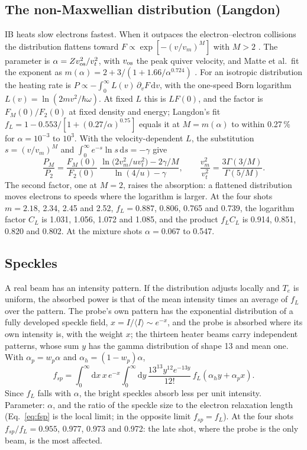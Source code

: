 \documentclass[11pt]{article}
\numberwithin{equation}{section}
\newcommand{\dd}{\mathrm d}
\newcommand{\vos}{v_{\rm os}}
\begin{document}
\subsection{The non-Maxwellian distribution (Langdon)}
\label{sec:langdon}
IB heats slow electrons fastest. When it outpaces the electron--electron collisions the
distribution flattens toward $F\propto\exp[-(v/v_m)^M]$ with $M>2$ \cite{Langdon1980}.
The parameter is $\alpha=Z\vos^2/v_t^2$, with $\vos$ the peak quiver velocity, and Matte et
al.\ fit the exponent as $m(\alpha)=2+3/(1+1.66/\alpha^{0.724})$ \cite{Matte1988}. For an
isotropic distribution the heating rate is $P\propto-\int_0^\infty L(v)\,\partial_vF\,\dd v$,
with the one-speed Born logarithm $L(v)=\ln(2mv^2/\hbar\omega)$. At fixed $L$ this is
$LF(0)$, and the factor is $F_M(0)/F_2(0)$ at fixed density and energy; Langdon's fit
$f_L=1-0.553/[1+(0.27/\alpha)^{0.75}]$ \cite{Langdon1980} equals it at $M=m(\alpha)$ to
within 0.27\,\% for $\alpha=10^{-3}$ to $10^3$. With the velocity-dependent $L$, the
substitution $s=(v/v_m)^M$ and $\int_0^\infty e^{-s}\ln s\,\dd s=-\gamma$ give
\begin{equation}
\frac{P_M}{P_2}=\frac{F_M(0)}{F_2(0)}\;
\frac{\ln\big(2v_m^2/uv_t^2\big)-2\gamma/M}{\ln(4/u)-\gamma},\qquad
\frac{v_m^2}{v_t^2}=\frac{3\Gamma(3/M)}{\Gamma(5/M)} .
\label{eq:langdon}
\end{equation}
The second factor, one at $M=2$, raises the absorption: a flattened distribution moves
electrons to speeds where the logarithm is larger. At the four shots $m=2.18$, 2.34, 2.45
and 2.52, $f_L=0.887$, 0.806, 0.765 and 0.739, the logarithm factor $C_L$ is 1.031, 1.056,
1.072 and 1.085, and the product $f_LC_L$ is 0.914, 0.851, 0.820 and 0.802. At the mixture shots $\alpha=0.067$ to 0.547.

\subsection{Speckles}
\label{sec:speckles}
A real beam has an intensity pattern. If the distribution adjusts locally and $T_e$ is
uniform, the absorbed power is that of the mean intensity times an average of $f_L$ over
the pattern. The probe's own pattern has the exponential distribution of a fully developed
speckle field, $x=I/\langle I\rangle\sim e^{-x}$, and the probe is absorbed where its own
intensity is, with the weight $x$; the thirteen heater beams carry independent patterns,
whose sum $y$ has the gamma distribution of shape 13 and mean one. With $\alpha_p=w_p\alpha$
and $\alpha_h=(1-w_p)\alpha$,
\begin{equation}
f_{sp}=\int_0^\infty\!\dd x\,x\,e^{-x}\int_0^\infty\!\dd y\,\frac{13^{13}y^{12}e^{-13y}}{12!}\,
f_L(\alpha_hy+\alpha_px).
\label{eq:fsp}
\end{equation}
Since $f_L$ falls with $\alpha$, the bright speckles absorb less per unit intensity.
Parameter: $\alpha$, and the ratio of the speckle size to the electron relaxation length
(Eq.~\eqref{eq:fsp} is the local limit; in the opposite limit $f_{sp}=f_L$). At the four
shots $f_{sp}/f_L=0.955$, 0.977, 0.973 and 0.972: the late shot, where the probe is the
only beam, is the most affected.
\end{document}
